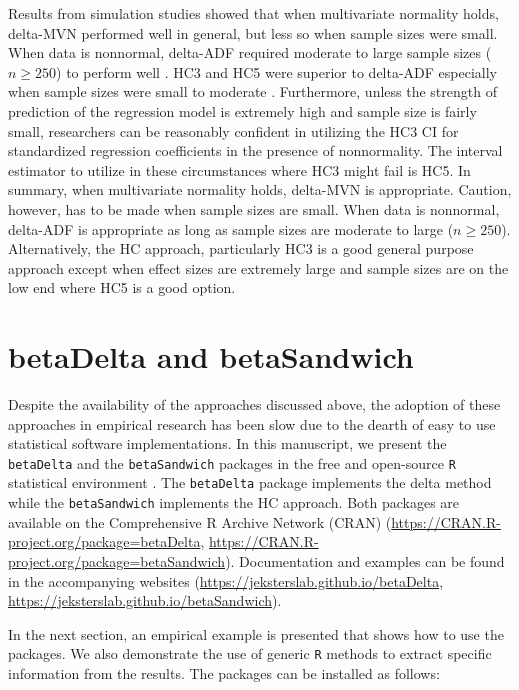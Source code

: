 \documentclass[man]{apa7}\usepackage[]{graphicx}\usepackage[]{xcolor}
\begin{document}
Results from simulation studies
\parencite{Lib-Regression-Standardized-Coefficients-Delta-Yuan-2011,
Lib-Regression-Standardized-Coefficients-Delta-Jones-2013a}
showed that when multivariate normality holds,
delta-MVN performed well in general,
but less so when sample sizes were small.
When data is nonnormal,
delta-ADF required moderate to large sample sizes ($n \geq 250$)
to perform well
\parencite{Lib-Regression-Standardized-Coefficients-Delta-Jones-2015}.
HC3 and HC5 were superior to delta-ADF
especially when sample sizes were small to moderate
\parencite{Lib-Regression-Standardized-Coefficients-HC-Dudgeon-2017}.
Furthermore,
unless the strength of prediction of the regression model is extremely high
and sample size is fairly small,
researchers can be reasonably confident in utilizing the HC3 CI
for standardized regression coefficients in the presence of nonnormality.
The interval estimator to utilize in these circumstances where HC3
might fail is HC5.
In summary,
when multivariate normality holds,
delta-MVN is appropriate.
Caution, however, has to be made when sample sizes are small.
When data is nonnormal,
delta-ADF is appropriate as long as sample sizes
are moderate to large ($n \geq 250$).
Alternatively,
the HC approach,
particularly HC3 is a good general purpose approach
except when effect sizes are extremely large and sample sizes are on the low end
where HC5 is a good option.

\section{betaDelta and betaSandwich}

Despite the availability of the approaches discussed above,
the adoption of these approaches in empirical research has been slow
due to the dearth of
easy to use statistical software implementations.
In this manuscript,
we present the \texttt{betaDelta} and the \texttt{betaSandwich} packages
in the free and open-source \texttt{R} statistical environment
\parencite{Lib-R-Manual-2022}.
The \texttt{betaDelta} package implements the delta method
while the \texttt{betaSandwich} implements the HC approach.
Both packages are available on the Comprehensive R Archive Network (CRAN)
(\url{https://CRAN.R-project.org/package=betaDelta},
\url{https://CRAN.R-project.org/package=betaSandwich}).
Documentation and examples can be found
in the accompanying websites
(\url{https://jeksterslab.github.io/betaDelta},
\url{https://jeksterslab.github.io/betaSandwich}).

In the next section,
an empirical example is presented that shows how to use the packages.
We also demonstrate the use of generic \texttt{R}
methods to extract specific information from the results.
The packages can be installed as follows:
\end{document}
